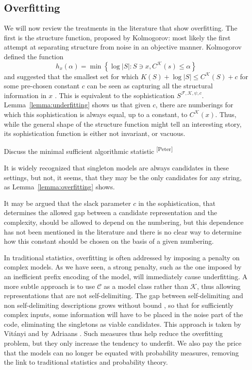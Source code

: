 \documentclass{style/llncs}
\newcommand{\C}{\mathscr C}
\newcommand{\F}{\mathscr F}
\newcommand{\K}{\mathscr K}
\newcommand{\s}{S}
\newcommand{\pb}[1]{\textcolor{OliveGreen}{\small #1 \textsuperscript{[Peter]} }}
\begin{document}
\subsection{Overfitting}

We will now review the treatments in the literature that show overfitting. The first is the structure function, proposed by Kolmogorov: most likely the first attempt at separating structure from noise in an objective manner. Kolmogorov defined the function
\[
h_x(\alpha) = \min \left \{\log |S| : S \ni x, C^\K(s) \leq \alpha \right \} 
\]
and suggested that the smallest set for which $K(S) + \log|S| \leq C^\K(S) + c$ for some pre-chosen constant $c$ can be seen as capturing all the structural information in $x$ \cite{cover1985kolmogorov}. This is equivalent to the sophistication $\s^{\F,\K,\psi,c}$. Lemma~\ref{lemma:underfitting} shows us that given $c$, there are numberings for which this sophistication is always equal, up to a constant, to $C^\K(x)$. Thus, while the general shape of the structure function might tell an interesting story, its sophistication function is either not invariant, or vacuous.
 
\pb{Discuss the minimal sufficient algorithmic statistic \cite{gacs2001algorithmic}} 

It is widely recognized that singleton models are always candidates in these settings, but not, it seems, that they may be the only candidates for any string, as Lemma~\ref{lemma:overfitting} shows.

It may be argued that the slack parameter $c$ in the sophistication, that determines the allowed gap between a candidate representation and the complexity, should be allowed to depend on the numbering, but this dependence has not been mentioned in the literature and there is no clear way to determine how this constant should be chosen on the basis of a given numbering. 

In traditional statistics, overfitting is often addressed by imposing a penalty on complex models. As we have seen, a strong penalty, such as the one imposed by an inefficient prefix encoding of the model, will immediately cause underfitting. A more subtle approach is to use $\C$ as a model class rather than $\K$, thus allowing representations that are not self-delimiting. The gap between self-delimiting and non self-delimiting descriptions grows without bound 
\cite[Section~4.5.5]{li1993introduction}, so that for sufficiently complex inputs, some information will have to be placed in the noise part of the code, eliminating the singletons as viable candidates. This approach is taken by Vit\'anyi \cite{vitanyi2004meaningful} and by Adriaans \cite{adriaans2012facticity}. Such measures thus help reduce the overfitting problem, but they only increase the tendency to underfit. We also pay the price that the models can no longer be equated with probability measures, removing the link to traditional statistics and probability theory.
\end{document}
